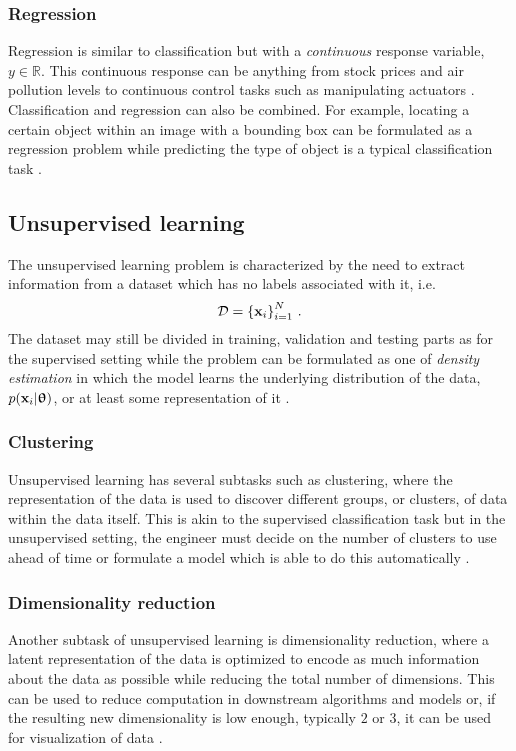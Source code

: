 \subsubsection{Regression}
Regression is similar to classification but with a \textit{continuous} response variable, $y\in\mathbb{R}$. This continuous response can be anything from stock prices and air pollution levels to continuous control tasks such as manipulating actuators \cite{Murphy2012}. Classification and regression can also be combined. For example, locating a certain object within an image with a bounding box can be formulated as a regression problem while predicting the type of object is a typical classification task \cite{Sermanet2013, Redmon2016}.

\subsection{Unsupervised learning}
The unsupervised learning problem is characterized by the need to extract information from a dataset which has no labels associated with it, i.e. 
\begin{equation}
    \mathcal{D} = {\left\{{\mathbf{x}}_i\right\}}_{i=1}^{N} \ .
\end{equation}
The dataset may still be divided in training, validation and testing parts as for the supervised setting while
the problem can be formulated as one of \textit{density estimation} in which the model learns the underlying distribution of the data, $p({\mathbf{x}}_i|{\boldsymbol{\uptheta}})$, or at least some representation of it \cite{Murphy2012}.

\subsubsection{Clustering}
Unsupervised learning has several subtasks such as clustering, where the representation of the data is used to discover different groups, or clusters, of data within the data itself. This is akin to the supervised classification task but in the unsupervised setting, the engineer must decide on the number of clusters to use ahead of time or formulate a model which is able to do this automatically \cite{Murphy2012}.

\subsubsection{Dimensionality reduction}
Another subtask of unsupervised learning is dimensionality reduction, where a latent representation of the data is optimized to encode as much information about the data as possible while reducing the total number of dimensions. This can be used to reduce computation in downstream algorithms and models or, if the resulting new dimensionality is low enough, typically $2$ or $3$, it can be used for visualization of data \cite{Murphy2012}.

